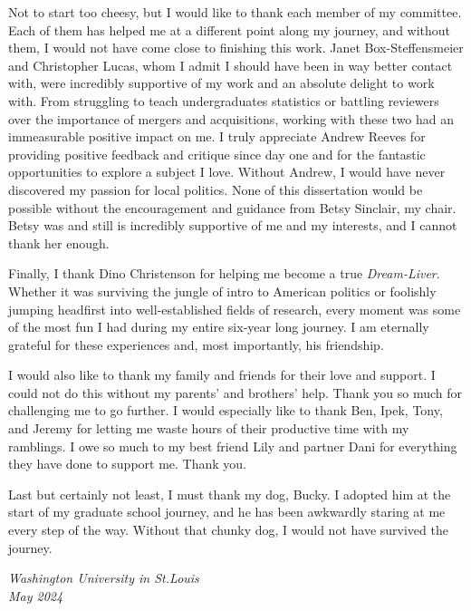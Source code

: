 \thesisacknowledgments

Not to start too cheesy, but I would like to thank each member of my committee. Each of them has helped me at a different point along my journey, and without them, I would not have come close to finishing this work. Janet Box-Steffensmeier and Christopher Lucas, whom I admit I should have been in way better contact with, were incredibly supportive of my work and an absolute delight to work with. From struggling to teach undergraduates statistics or battling reviewers over the importance of mergers and acquisitions, working with these two had an immeasurable positive impact on me. I truly appreciate Andrew Reeves for providing positive feedback and critique since day one and for the fantastic opportunities to explore a subject I love. Without Andrew, I would have never discovered my passion for local politics. None of this dissertation would be possible without the encouragement and guidance from Betsy Sinclair, my chair. Betsy was and still is incredibly supportive of me and my interests, and I cannot thank her enough. 

Finally, I thank Dino Christenson for helping me become a true \textit{Dream-Liver}. Whether it was surviving the jungle of intro to American politics or foolishly jumping headfirst into well-established fields of research, every moment was some of the most fun I had during my entire six-year long journey. I am eternally grateful for these experiences and, most importantly, his friendship.

I would also like to thank my family and friends for their love and support. I could not do this without my parents' and brothers' help. Thank you so much for challenging me to go further. I would especially like to thank Ben, Ipek, Tony, and Jeremy for letting me waste hours of their productive time with my ramblings. I owe so much to my best friend Lily and partner Dani for everything they have done to support me. Thank you.

Last but certainly not least, I must thank my dog, Bucky. I adopted him at the start of my graduate school journey, and he has been awkwardly staring at me every step of the way. Without that chunky dog, I would not have survived the journey.

\null\hfill \thesisauthor

\noindent
\textit{Washington University in St.\@ Louis}\\
\textit{May 2024}
